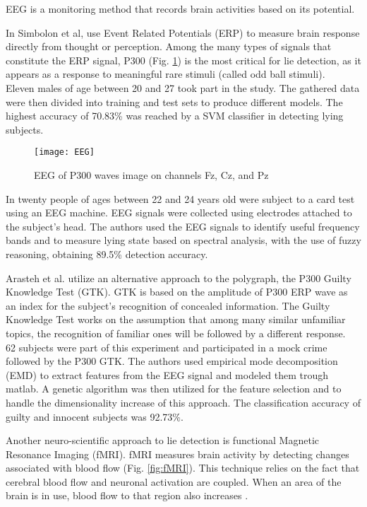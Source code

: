 EEG is a monitoring method that records brain activities based on its potential.

In \cite{7440177} Simbolon et al, use Event Related Potentials (ERP) to measure brain response directly from thought or perception. Among the many types of signals that constitute the ERP signal, P300 (Fig. \ref{fig:EEG}) is the most critical for lie detection, as it appears as a response to meaningful rare stimuli (called odd ball stimuli). \\
Eleven males of age between 20 and 27 took part in the study. The gathered data were then divided into training and test sets to produce different models. The highest accuracy of 70.83\% was reached by a SVM classifier in detecting lying subjects.

\begin{figure}[H]
	\centering
	\texttt{[image: EEG]}
	\caption{EEG of P300 waves image on channels Fz, Cz, and Pz}
	\label{fig:EEG}
\end{figure}

In \cite{Lai2017} twenty people of ages between 22 and 24 years old were subject to a card test using an EEG machine. EEG signals were collected using electrodes attached to the subject’s head. The authors used the EEG signals to identify useful frequency bands and to measure lying state based on spectral analysis, with the use of fuzzy reasoning, obtaining 89.5\% detection accuracy.

Arasteh et al. \cite{7511728} utilize an alternative approach to the polygraph, the P300 Guilty Knowledge Test (GTK). GTK is based on the amplitude of P300 ERP wave as an index for the subject's recognition of concealed information. The Guilty Knowledge Test works on the assumption that among many similar unfamiliar topics, the recognition of familiar ones will be followed by a different response. \\
62 subjects were part of this experiment and participated in a mock crime followed by the P300 GTK. The authors used empirical mode decomposition (EMD) to extract features from the EEG signal and modeled them trough matlab. A genetic algorithm was then utilized for the feature selection and to handle the dimensionality increase of this approach. The classification accuracy of guilty and innocent subjects was 92.73\%.

Another neuro-scientific approach to lie detection is functional Magnetic Resonance Imaging (fMRI). fMRI measures brain activity by detecting changes associated with blood flow (Fig. \ref{fig:fMRI}). This technique relies on the fact that cerebral blood flow and neuronal activation are coupled. When an area of the brain is in use, blood flow to that region also increases \cite{WikifMRI}.

